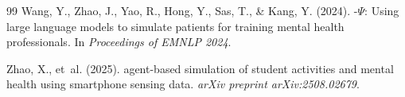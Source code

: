 \documentclass[review,12pt,authoryear]{elsarticle}
\begin{document}
\begin{thebibliography}{99}
Wang, Y., Zhao, J., Yao, R., Hong, Y., Sas, T., \& Kang, Y. (2024).
-$\Psi$: {U}sing large language models to simulate patients for training mental health professionals.
\newblock In \textit{Proceedings of EMNLP 2024}.

Zhao, X., et~al. (2025).
 agent-based simulation of student activities and mental health using smartphone sensing data.
\newblock \textit{arXiv preprint arXiv:2508.02679}.

\end{thebibliography}
\end{document}

